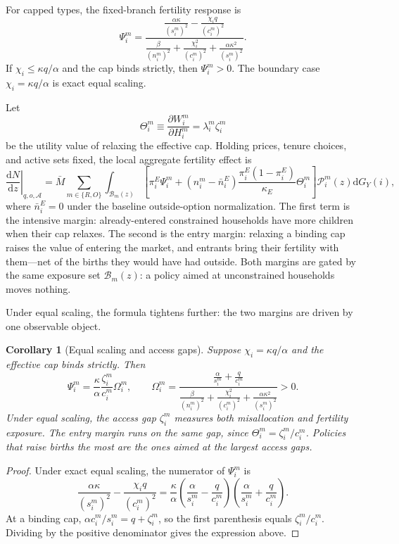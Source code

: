 \documentclass[11pt]{article}
\newtheorem{corollary}{Corollary}
\newcommand{\dd}{\mathrm d}
\newcommand{\1}{\mathbf 1}
\begin{document}
For capped types, the fixed-branch fertility response is
\[
\Psi_i^m
=
\frac{
\frac{\alpha\kappa}{(s_i^m)^2}
-
\frac{\chi_i q}{(c_i^m)^2}
}{
\frac{\beta}{(n_i^m)^2}
+
\frac{\chi_i^2}{(c_i^m)^2}
+
\frac{\alpha\kappa^2}{(s_i^m)^2}
}.
\]
If $\chi_i\le \kappa q/\alpha$ and the cap binds strictly, then $\Psi_i^m>0$. The boundary case $\chi_i=\kappa q/\alpha$ is exact equal scaling.

Let
\[
\Theta_i^m
\equiv
\frac{\partial W_i^m}{\partial H_i^m}
=
\lambda_i^m\zeta_i^m
\]
be the utility value of relaxing the effective cap. Holding prices, tenure choices, and active sets fixed, the local aggregate fertility effect is
\[
\left.\frac{\dd N}{\dd z}\right|_{q,o,\mathcal A}
=
\bar M
\sum_{m\in\{R,O\}}
\int_{\mathcal B_m(z)}
\left[
\pi_i^E\Psi_i^m
+
(n_i^m-\bar n_i^E)
\frac{\pi_i^E(1-\pi_i^E)}{\kappa_E}
\Theta_i^m
\right]
\mathcal P_i^m(z)
\dd G_Y(i),
\]
where $\bar n_i^E=0$ under the baseline outside-option normalization. The first term is the intensive margin: already-entered constrained households have more children when their cap relaxes. The second is the entry margin: relaxing a binding cap raises the value of entering the market, and entrants bring their fertility with them---net of the births they would have had outside. Both margins are gated by the same exposure set $\mathcal B_m(z)$: a policy aimed at unconstrained households moves nothing.

Under equal scaling, the formula tightens further: the two margins are driven by one observable object.

\begin{corollary}[Equal scaling and access gaps]
Suppose $\chi_i=\kappa q/\alpha$ and the effective cap binds strictly. Then
\[
\Psi_i^m
=
\frac{\kappa}{\alpha}
\frac{\zeta_i^m}{c_i^m}
\Omega_i^m,
\qquad
\Omega_i^m
=
\frac{
\frac{\alpha}{s_i^m}+\frac{q}{c_i^m}
}{
\frac{\beta}{(n_i^m)^2}
+
\frac{\chi_i^2}{(c_i^m)^2}
+
\frac{\alpha\kappa^2}{(s_i^m)^2}
}
>0.
\]
Under equal scaling, the access gap $\zeta_i^m$ measures both misallocation and fertility exposure. The entry margin runs on the same gap, since $\Theta_i^m=\zeta_i^m/c_i^m$. Policies that raise births the most are the ones aimed at the largest access gaps.
\end{corollary}

\begin{proof}
Under exact equal scaling, the numerator of $\Psi_i^m$ is
\[
\frac{\alpha\kappa}{(s_i^m)^2}
-
\frac{\chi_i q}{(c_i^m)^2}
=
\frac{\kappa}{\alpha}
\left(\frac{\alpha}{s_i^m}-\frac{q}{c_i^m}\right)
\left(\frac{\alpha}{s_i^m}+\frac{q}{c_i^m}\right).
\]
At a binding cap, $\alpha c_i^m/s_i^m=q+\zeta_i^m$, so the first parenthesis equals $\zeta_i^m/c_i^m$. Dividing by the positive denominator gives the expression above.
\end{proof}
\end{document}
